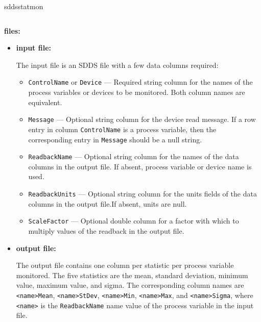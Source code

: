 \begin{sddsprog}{sddsstatmon}
\begin{verbatim}
\end{verbatim}
\item {\bf files:}
\begin{itemize}
\item {\bf input file:}\par
The input file is an SDDS file with a few data columns required:
\begin{itemize}
        \item {\tt ControlName} or {\tt Device} --- Required string column for the names of the process variables
                or devices to be monitored. Both column names are equivalent.
        \item {\tt Message} --- Optional string column for the device read message. If a row entry in
                column {\tt ControlName} is a process variable, then the corresponding entry
                in {\tt Message} should be a null string. 
        \item {\tt ReadbackName} --- Optional string column for the names of the data columns in the 
                output file. If absent, process variable or device name is used.
        \item {\tt ReadbackUnits} --- Optional string column for the units fields of the data columns in the 
                output file.If absent, units are null.
        \item {\tt ScaleFactor} --- Optional double column for a factor with which to multiply
                values of the readback in the output file.
\end{itemize}

\item {\bf output file:}\par
The output file contains one column per statistic per process variable monitored.
The five statistics are the mean, standard deviation, minimum value,
maximum value, and sigma. The corresponding column names are {\tt <name>Mean}, {\tt <name>StDev},
{\tt <name>Min}, {\tt <name>Max}, and {\tt <name>Sigma}, where {\tt <name>}
is the {\tt ReadbackName} name value of the process variable in the input file.


\end{itemize}
\end{sddsprog}
